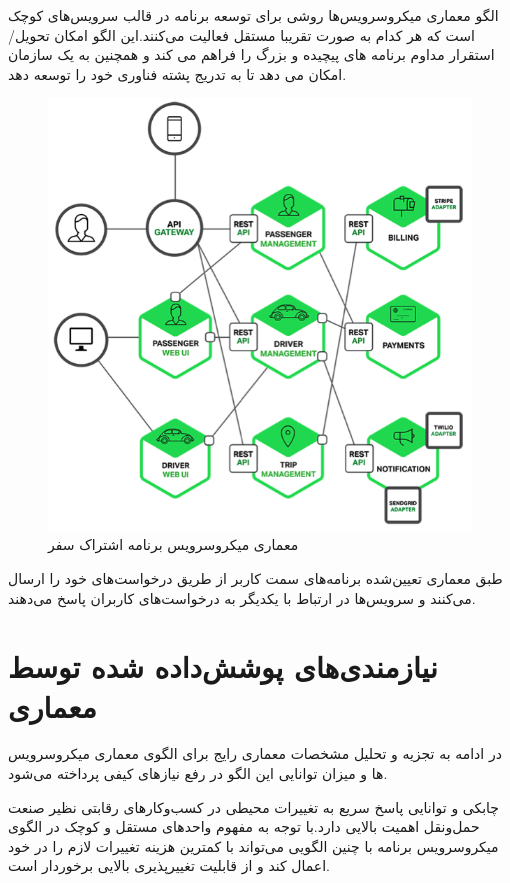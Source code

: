 الگو معماری میکرو‌سرویس‌ها روشی برای توسعه برنامه در قالب سرویس‌های کوچک است که هر کدام به صورت تقریبا مستقل فعالیت می‌کنند.این الگو امکان تحویل/استقرار مداوم برنامه های پیچیده و بزرگ را فراهم می کند و همچنین به یک سازمان امکان می دهد تا به تدریج پشته فناوری خود را توسعه دهد.
\begin{figure}[h]
\centering
\includegraphics[scale=0.7]{trip.png}
\caption{معماری میکروسرویس برنامه اشتراک سفر}
\label{fig:trip}
\end{figure}

طبق معماری تعیین‌شده برنامه‌های سمت کاربر از طریق  درخواست‌های خود را ارسال می‌کنند و سرویس‌ها در ارتباط با یکدیگر به درخواست‌های کاربران پاسخ می‌دهند.
\section{نیازمندی‌های پوشش‌داده شده توسط معماری}
در ادامه به تجزیه و تحلیل مشخصات معماری رایج برای الگوی معماری میکرو‌سرویس ها و میزان توانایی این الگو در رفع نیاز‌های کیفی پرداخته می‌شود.

چابکی و توانایی پاسخ سریع به تغییرات محیطی در کسب‌و‌کار‌های رقابتی نظیر صنعت حمل‌و‌نقل اهمیت بالایی دارد.با توجه به مفهوم واحدهای مستقل و کوچک در الگوی میکرو‌سرویس برنامه با چنین الگویی می‌تواند با کمترین هزینه تغییرات لازم را در خود اعمال کند و از قابلیت تغییر‌پذیری بالایی برخوردار است.

